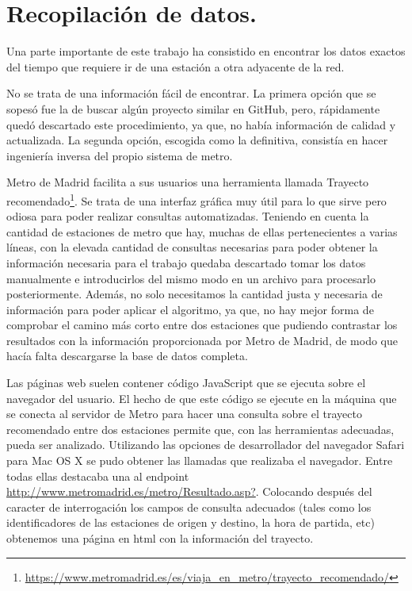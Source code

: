 \documentclass[spanish, a4paper, 12pt] {article}
\begin{document}
\section{Recopilación de datos.}
Una parte importante de este trabajo ha consistido en encontrar los datos exactos del tiempo que requiere ir de una estación a otra adyacente de la red.\\ \par
No se trata de una información fácil de encontrar. La primera opción que se sopesó fue la de buscar algún proyecto similar en GitHub, pero, rápidamente quedó descartado este procedimiento, ya que, no había información de calidad y actualizada. La segunda opción, escogida como la definitiva, consistía en hacer ingeniería inversa del propio sistema de metro.\\ \par
Metro de Madrid facilita a sus usuarios una herramienta llamada Trayecto recomendado\footnote{\url{https://www.metromadrid.es/es/viaja_en_metro/trayecto_recomendado/}}. Se trata de una interfaz gráfica muy útil para lo que sirve pero odiosa para poder realizar consultas automatizadas. Teniendo en cuenta la cantidad de estaciones de metro que hay, muchas de ellas pertenecientes a varias líneas, con la elevada cantidad de consultas necesarias para poder obtener la información necesaria para el trabajo quedaba descartado tomar los datos manualmente e introducirlos del mismo modo en un archivo para procesarlo posteriormente. Además, no solo necesitamos la cantidad justa y necesaria de información para poder aplicar el algoritmo, ya que, no hay mejor forma de comprobar el camino más corto entre dos estaciones que pudiendo contrastar los resultados con la información proporcionada por Metro de Madrid, de modo que hacía falta descargarse la base de datos completa.\\ \par
Las páginas web suelen contener código JavaScript que se ejecuta sobre el navegador del usuario. El hecho de que este código se ejecute en la máquina que se conecta al servidor de Metro para hacer una consulta sobre el trayecto recomendado entre dos estaciones permite que, con las herramientas adecuadas, pueda ser analizado. Utilizando las opciones de desarrollador del navegador Safari para Mac OS X se pudo obtener las llamadas que realizaba el navegador. Entre todas ellas destacaba una al endpoint \url{http://www.metromadrid.es/metro/Resultado.asp?}. Colocando después del caracter de interrogación los campos de consulta adecuados (tales como los identificadores de las estaciones de origen y destino, la hora de partida, etc) obtenemos una página en html con la información del trayecto.\\ \par
\end{document}
